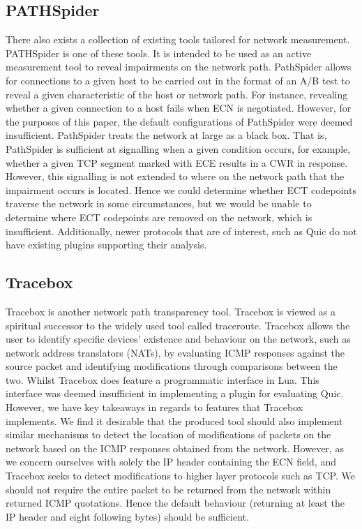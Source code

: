 \documentclass{l4proj}
\begin{document}
\subsection{PATHSpider}

There also exists a collection of existing tools tailored for network measurement. PATHSpider\citep{learmonth_pathspider_2016} is one of these tools. It is intended to be used as an active measurement tool to reveal impairments on the network path. PathSpider allows for connections to a given host to be carried out in the format of an A/B test to reveal a given characteristic of the host or network path\citep{learmonth_pathspider_2016}. For instance, revealing whether a given connection to a host fails when ECN is negotiated. However, for the purposes of this paper, the default configurations of PathSpider were deemed insufficient. PathSpider treats the network at large as a black box. That is, PathSpider is sufficient at signalling when a given condition occurs, for example, whether a given TCP segment marked with ECE results in a CWR in response. However, this signalling is not extended to where on the network path that the impairment occurs is located. Hence we could determine whether ECT codepoints traverse the network in some circumstances, but we would be unable to determine where ECT codepoints are removed on the network, which is insufficient. Additionally, newer protocols that are of interest, such as Quic do not have existing plugins supporting their analysis.

\subsection{Tracebox}

Tracebox is another network path transparency tool. Tracebox is viewed as a spiritual successor to the widely used tool called traceroute. Tracebox allows the user to identify specific devices' existence and behaviour on the network, such as network address translators (NATs), by evaluating ICMP responses against the source packet and identifying modifications through comparisons between the two\citep{vanaubel_tracebox_2013}. Whilst Tracebox does feature a programmatic interface in Lua. This interface was deemed insufficient in implementing a plugin for evaluating Quic. However, we have key takeaways in regards to features that Tracebox implements. We find it desirable that the produced tool should also implement similar mechanisms to detect the location of modifications of packets on the network based on the ICMP responses obtained from the network. However, as we concern ourselves with solely the IP header containing the ECN field, and Tracebox seeks to detect modifications to higher layer protocols such as TCP. We should not require the entire packet to be returned from the network within returned ICMP quotations. Hence the default behaviour (returning at least the IP header and eight following bytes) should be sufficient.
\end{document}

